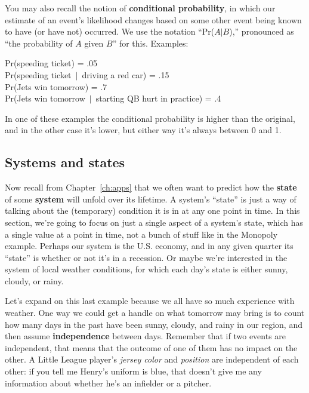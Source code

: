 \begin{alttitles}

You may also recall the notion of \textbf{conditional probability}, in which
our estimate of an event's likelihood changes based on some other event being
known to have (or have not) occurred. We use the notation ``Pr($A|B$),''
pronounced as ``the probability of $A$ given $B$'' for this. Examples:

\begin{center}
Pr(speeding ticket) = .05 \\
\smallskip
Pr(speeding ticket\ $|$\ driving a red car) = .15 \\[12pt]
\medskip
Pr(Jets win tomorrow) = .7 \\
\smallskip
Pr(Jets win tomorrow\ $|$\ starting QB hurt in practice) = .4 \\
\end{center}

In one of these examples the conditional probability is higher than the
original, and in the other case it's lower, but either way it's always between
0 and 1.

\subsection{Systems and states}


Now recall from Chapter~\ref{ch:apps} that we often want to predict how the
\textbf{state} of some \textbf{system} will unfold over its lifetime. A
system's ``state'' is just a way of talking about the (temporary) condition it
is in at any one point in time. In this section, we're going to focus on just a
single aspect of a system's state, which has a single value at a point in time,
not a bunch of stuff like in the Monopoly example. Perhaps our system is the
U.S. economy, and in any given quarter its ``state'' is whether or not it's in
a recession. Or maybe we're interested in the system of local weather
conditions, for which each day's state is either sunny, cloudy, or rainy.


Let's expand on this last example because we all have so much experience with
weather. One way we could get a handle on what tomorrow may bring is to count
how many days in the past have been sunny, cloudy, and rainy in our region, and
then assume \textbf{independence} between days. Remember that if two events are
independent, that means that the outcome of one of them has no impact on the
other. A Little League player's \textsl{jersey color} and \textsl{position} are
independent of each other: if you tell me Henry's uniform is blue, that doesn't
give me any information about whether he's an infielder or a pitcher.


\end{alttitles}
